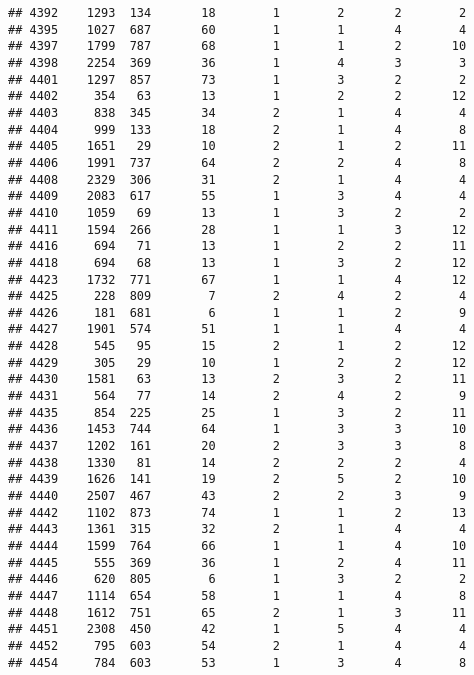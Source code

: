 \documentclass[]{article}
\begin{document}
\begin{verbatim}
## 4392    1293  134       18        1        2       2        2
## 4395    1027  687       60        1        1       4        4
## 4397    1799  787       68        1        1       2       10
## 4398    2254  369       36        1        4       3        3
## 4401    1297  857       73        1        3       2        2
## 4402     354   63       13        1        2       2       12
## 4403     838  345       34        2        1       4        4
## 4404     999  133       18        2        1       4        8
## 4405    1651   29       10        2        1       2       11
## 4406    1991  737       64        2        2       4        8
## 4408    2329  306       31        2        1       4        4
## 4409    2083  617       55        1        3       4        4
## 4410    1059   69       13        1        3       2        2
## 4411    1594  266       28        1        1       3       12
## 4416     694   71       13        1        2       2       11
## 4418     694   68       13        1        3       2       12
## 4423    1732  771       67        1        1       4       12
## 4425     228  809        7        2        4       2        4
## 4426     181  681        6        1        1       2        9
## 4427    1901  574       51        1        1       4        4
## 4428     545   95       15        2        1       2       12
## 4429     305   29       10        1        2       2       12
## 4430    1581   63       13        2        3       2       11
## 4431     564   77       14        2        4       2        9
## 4435     854  225       25        1        3       2       11
## 4436    1453  744       64        1        3       3       10
## 4437    1202  161       20        2        3       3        8
## 4438    1330   81       14        2        2       2        4
## 4439    1626  141       19        2        5       2       10
## 4440    2507  467       43        2        2       3        9
## 4442    1102  873       74        1        1       2       13
## 4443    1361  315       32        2        1       4        4
## 4444    1599  764       66        1        1       4       10
## 4445     555  369       36        1        2       4       11
## 4446     620  805        6        1        3       2        2
## 4447    1114  654       58        1        1       4        8
## 4448    1612  751       65        2        1       3       11
## 4451    2308  450       42        1        5       4        4
## 4452     795  603       54        2        1       4        4
## 4454     784  603       53        1        3       4        8

\end{verbatim}
\end{document}

